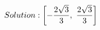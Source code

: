 \documentclass[preview]{standalone}
\begin{document}
\begin{align*}
\special{dvisvgm:raw <g id='unique000'>}Solution: \left[ - \frac{2 \sqrt{3}}{3}, \  \frac{2 \sqrt{3}}{3}\right]\special{dvisvgm:raw </g>}
\end{align*}
\end{document}
